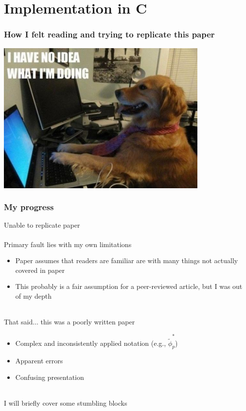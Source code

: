 \documentclass{beamer}
\begin{document}
	     \section{Implementation in C}
	     \begin{frame}
		     \frametitle{How I felt reading and trying to replicate this
		     paper}
	\begin{center}
		\includegraphics[height=3in, keepaspectratio]{dog.jpg}
	\end{center}

	     \end{frame}
	     \begin{frame}
		     \frametitle{My progress}
		     Unable to replicate paper \\~\\

		     Primary fault lies with my own limitations
		     \begin{itemize}
			     \item \small Paper assumes that
				     readers are familiar are with many things
				     not actually covered in paper
			     \item \small This probably is a fair assumption for a
				     peer-reviewed article, but I was
				     out of my depth \\~\\
		     \end{itemize}

		    That said$\ldots$ this was a poorly written paper 
		     \begin{itemize}
			     \item \small Complex and inconsistently applied
				     notation (e.g., $\hat{\tilde{\phi}}^{*}_{p}$)
			     \item \small Apparent errors
			     \item \small Confusing presentation\\~\\
		     \end{itemize}

		     I will briefly cover some stumbling blocks
	     \end{frame}
\end{document}
